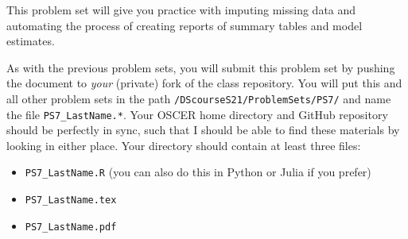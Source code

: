 \documentclass[12pt,english]{exam}
\begin{document}
This problem set will give you practice with imputing missing data and automating the process of creating reports of summary tables and model estimates.

As with the previous problem sets, you will submit this problem set by pushing the document to \emph{your} (private) fork of the class repository. You will put this and all other problem sets in the path \texttt{/DScourseS21/ProblemSets/PS7/} and name the file \texttt{PS7\_LastName.*}. Your OSCER home directory and GitHub repository should be perfectly in sync, such that I should be able to find these materials by looking in either place. Your directory should contain at least three files:
\begin{itemize}
    \item \texttt{PS7\_LastName.R} (you can also do this in Python or Julia if you prefer)
    \item \texttt{PS7\_LastName.tex}
    \item \texttt{PS7\_LastName.pdf}
\end{itemize}
\end{document}
